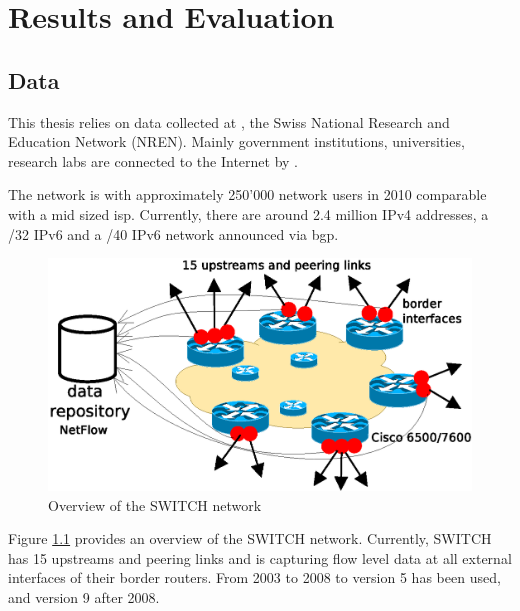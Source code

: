 \chapter{Results and Evaluation 
\label{chapter:results}}

\section{Data
\label{section:data}}

This thesis relies on data collected at \citet{switch}, the Swiss National Research and Education Network (NREN). 
Mainly government institutions, universities, research labs are connected to the Internet by \citet{switch}\citep{Schatzmann:Mining}.

The \citet{switch} network is with approximately 250'000 network users in 2010 comparable with a mid sized \gls{isp}. Currently, there are around 2.4 million \gls{IPv4} addresses, a /32 IPv6 and a /40 \gls{IPv6} network announced via \gls{bgp}\citep{Schatzmann:Tracing}.

\begin{figure}[ht] 
	\centering
	\includegraphics[width=12cm]{images/network_overview.eps}
	\caption{Overview of the SWITCH network \citep{SchatzmanThesis2012}} 
	\label{fig:switch_nework}
\end{figure}

Figure \ref{fig:switch_nework} provides an overview of the SWITCH network. 
Currently, SWITCH has 15 upstreams and peering links and is capturing flow level data at all external interfaces of their border routers. From 2003 to 2008 to version 5 has been used, and version 9 after 2008\citep{Schatzmann:Tracing}.

